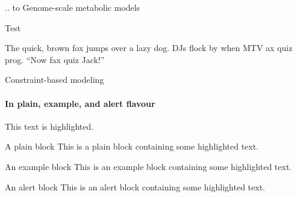 \documentclass{beamer}
\begin{document}
   
   \begin{frame}[label=lists]{.. to Genome-scale metabolic models}


      Test
      \\ \bigskip
      \justifying


      The quick, brown fox jumps over a lazy
      dog. DJs flock by when MTV ax quiz prog. “Now fax quiz Jack!”

   \end{frame}


   \begin{frame}[label=simmonshall]{Constraint-based modeling} 

      \framesubtitle{In plain, example, and \alert{alert} flavour}
      \alert{This text} is highlighted.

      \begin{block}{A plain block}
            This is a plain block containing some \alert{highlighted text}.
      \end{block}
      
      \begin{exampleblock}{An example block}
            This is an example block containing some \alert{highlighted text}.
      \end{exampleblock}

      \begin{alertblock}{An alert block}
            This is an alert block containing some \alert{highlighted text}.
      \end{alertblock} 

   \end{frame}
\end{document}
